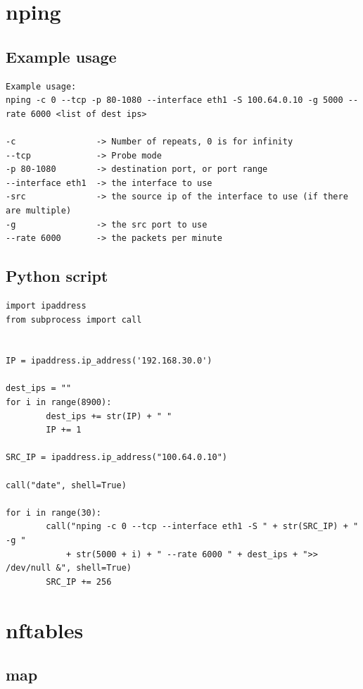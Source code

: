 \documentclass{report}
\begin{document}
\section{nping}\label{nping}

\subsection{Example usage}

\begingroup
\fontsize{9pt}{9pt}\selectfont
\begin{verbatim}
Example usage:
nping -c 0 --tcp -p 80-1080 --interface eth1 -S 100.64.0.10 -g 5000 --rate 6000 <list of dest ips>

-c                -> Number of repeats, 0 is for infinity
--tcp             -> Probe mode
-p 80-1080        -> destination port, or port range
--interface eth1  -> the interface to use
-src              -> the source ip of the interface to use (if there are multiple)
-g                -> the src port to use
--rate 6000       -> the packets per minute
\end{verbatim}
\endgroup

\subsection{Python script}

\begingroup
\fontsize{9pt}{9pt}\selectfont
\begin{verbatim}
import ipaddress
from subprocess import call


IP = ipaddress.ip_address('192.168.30.0')

dest_ips = ""
for i in range(8900):
        dest_ips += str(IP) + " "
        IP += 1

SRC_IP = ipaddress.ip_address("100.64.0.10")

call("date", shell=True)

for i in range(30):
        call("nping -c 0 --tcp --interface eth1 -S " + str(SRC_IP) + " -g "
        	+ str(5000 + i) + " --rate 6000 " + dest_ips + ">> /dev/null &", shell=True)
        SRC_IP += 256
\end{verbatim}
\endgroup

\section{nftables}\label{nftables-1}

\subsection{map}
\end{document}
